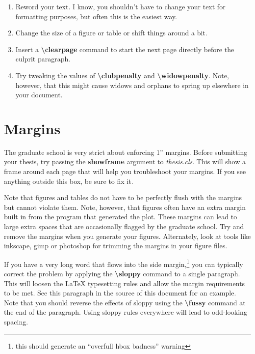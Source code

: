 \documentclass[master]{thesis}
\begin{document}
\begin{enumerate}
    \item Reword your text.  I know, you shouldn't have to change your text for formatting purposes, but often this is the easiest way.

    \item Change the size of a figure or table or shift things around a bit.

    \item Insert a \textbf{\textbackslash clearpage} command to start the next page directly before the culprit paragraph.

    \item Try tweaking the values of \textbf{\textbackslash clubpenalty} and \textbf{\textbackslash widowpenalty}.  Note, however, that this might cause widows and orphans to spring up elsewhere in your document.
\end{enumerate}

\section{Margins}

The graduate school is very strict about enforcing 1'' margins.  Before submitting your thesis, try passing the \textbf{showframe} argument to \textit{thesis.cls}.  This will show a frame around each page that will help you troubleshoot your margins.  If you see anything outside this box, be sure to fix it.

Note that figures and tables do not have to be perfectly flush with the margins but cannot violate them.  Note, however, that figures often have an extra margin built in from the program that generated the plot.  These margins can lead to large extra spaces that are occasionally flagged by the graduate school.  Try and remove the margins when you generate your figures.  Alternately, look at tools like inkscape, gimp or photoshop for trimming the margins in your figure files.

\sloppy
If you have a very long word that flows into the side margin,\footnote{this should generate an ``overfull hbox badness'' warning} you can typically correct the problem by applying the \textbf{\textbackslash sloppy} command to a single paragraph.  This will loosen the \LaTeX{} typesetting rules and allow the margin requirements to be met.  See this paragraph in the source of this document for an example.  Note that you should reverse the effects of sloppy using the \textbf{\textbackslash fussy} command at the end of the paragraph.  Using sloppy rules everywhere will lead to odd-looking spacing.
\fussy
\end{document}
